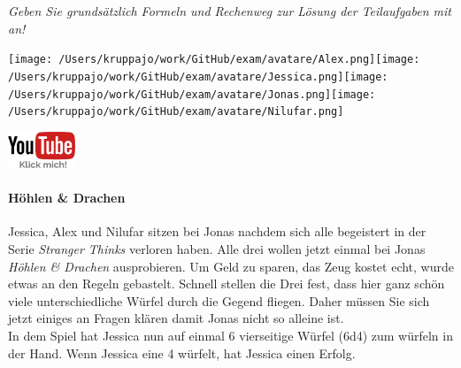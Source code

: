 \documentclass[a4paper, 9pt]{scrartcl}\usepackage[]{graphicx}\usepackage[]{xcolor}
\begin{document}
\textit{Geben Sie grundsätzlich Formeln und Rechenweg zur Lösung der Teilaufgaben mit an!} \\[1Ex]
 

 
\ifcollection
\begin{flushright}
\tiny\vspace{-3Ex}
\textbf{\examinhaltstart}
\exammodulemathstat
\vspace{-4Ex}
\end{flushright}
\begin{minipage}[t]{0.5\textwidth}
\texttt{[image: /Users/kruppajo/work/GitHub/exam/avatare/Alex.png]}\hspace{-4mm}\texttt{[image: /Users/kruppajo/work/GitHub/exam/avatare/Jessica.png]}\hspace{-4mm}\texttt{[image: /Users/kruppajo/work/GitHub/exam/avatare/Jonas.png]}\hspace{-4mm}\texttt{[image: /Users/kruppajo/work/GitHub/exam/avatare/Nilufar.png]}
\end{minipage}
\begin{minipage}[t]{0.5\textwidth}
\hfill
\href{https://youtu.be/8Pb2sKUIMyk}{\includegraphics[width = 2cm]{img/youtube}}
\end{minipage}
\fi




\ifcollection
\paragraph{Höhlen \& Drachen}
\fi



Jessica, Alex und Nilufar sitzen bei Jonas nachdem sich alle begeistert in der Serie \textit{Stranger Thinks} verloren haben. Alle drei wollen jetzt einmal bei Jonas \textit{Höhlen \& Drachen} ausprobieren. Um Geld zu sparen, das Zeug kostet echt, wurde etwas an den Regeln gebastelt. Schnell stellen die Drei fest, dass hier ganz schön viele unterschiedliche Würfel durch die Gegend fliegen. Daher müssen Sie sich jetzt einiges an Fragen klären damit Jonas nicht so alleine ist. \\%

In dem Spiel hat Jessica nun auf einmal 6 vierseitige Würfel (6d4) zum würfeln in der Hand. Wenn Jessica eine 4 würfelt, hat Jessica einen Erfolg.
\end{document}
